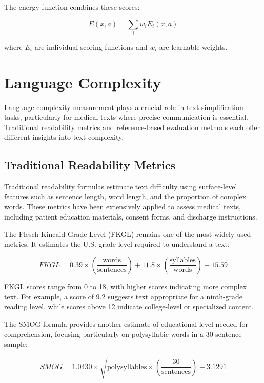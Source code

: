 The energy function combines these scores:

\begin{equation}
    E(x, a) = \sum_i w_i E_i(x, a)
\end{equation}

where $E_i$ are individual scoring functions and $w_i$ are learnable weights.

\section{Language Complexity}
\label{c2:s:linguistic-complexity}

Language complexity measurement plays a crucial role in text simplification tasks, particularly for medical texts where precise communication is essential. Traditional readability metrics and reference-based evaluation methods each offer different insights into text complexity.

\subsection{Traditional Readability Metrics}

Traditional readability formulas estimate text difficulty using surface-level features such as sentence length, word length, and the proportion of complex words. These metrics have been extensively applied to assess medical texts, including patient education materials, consent forms, and discharge instructions.

The Flesch-Kincaid Grade Level (FKGL) remains one of the most widely used metrics. It estimates the U.S. grade level required to understand a text:

\begin{equation}
    FKGL = 0.39 \times \left(\frac{\text{words}}{\text{sentences}}\right) + 11.8 \times \left(\frac{\text{syllables}}{\text{words}}\right) - 15.59
\end{equation}

FKGL scores range from 0 to 18, with higher scores indicating more complex text. For example, a score of 9.2 suggests text appropriate for a ninth-grade reading level, while scores above 12 indicate college-level or specialized content.

The SMOG formula provides another estimate of educational level needed for comprehension, focusing particularly on polysyllabic words in a 30-sentence sample:

\begin{equation}
    SMOG = 1.0430 \times \sqrt{\text{polysyllables} \times \left(\frac{30}{\text{sentences}}\right)} + 3.1291
\end{equation}

